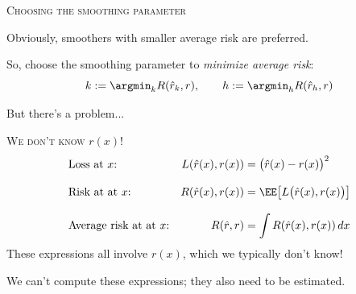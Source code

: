 \documentclass{beamer}
\begin{document}
\begin{frame}{\textsc{Choosing the smoothing parameter}}

    Obviously, smoothers with smaller average risk are preferred.

    So, choose the smoothing parameter to \emph{minimize average risk}:
    \[
        k := \argmin_k R(\hat r_k, r),\qquad
        h := \argmin_h R(\hat r_h, r)
    \]

    But there's a problem...
\end{frame}

\begin{frame}{\textsc{We don't know $r(x)$!}}
    \vspace{-5ex}
    \begin{align*}
        &\text{Loss at $x$:}& L(\hat r(x), r(x)) &= \big(\hat r(x) - r(x)\big)^2\\[2ex]
        &\text{Risk at at $x$:}& R(\hat r(x), r(x)) &= \EE\big[L\big(\hat r(x), r(x)\big)\big]\\[2ex]
        &\text{Average risk at at $x$:}& R(\hat r, r) &= \int R(\hat r(x), r(x))\,dx\\
    \end{align*}
    These expressions all involve $r(x)$, which we typically don't know!

    We can't compute these expressions; they also need to be estimated.
\end{frame}
\end{document}

